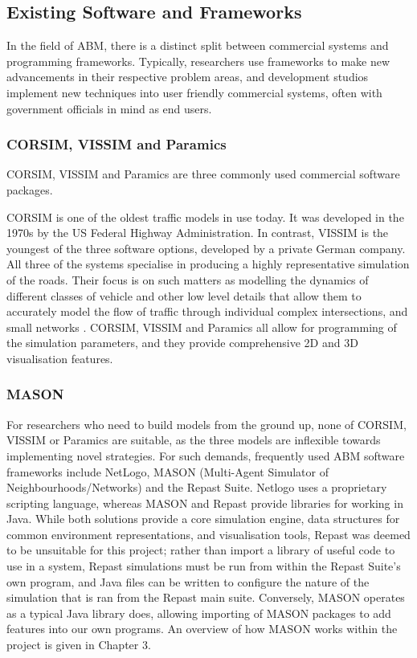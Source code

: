\subsection{Existing Software and Frameworks}

In the field of ABM, there is a distinct split between commercial systems and programming frameworks. Typically, researchers use frameworks to make new advancements in their respective problem areas, and development studios implement new techniques into user friendly commercial systems, often with government officials in mind as end users.

\subsubsection{CORSIM, VISSIM and Paramics}

CORSIM, VISSIM and Paramics are three commonly used commercial software packages.

CORSIM is one of the oldest traffic models in use today. It was developed in the 1970s by the US Federal Highway Administration. In contrast, VISSIM is the youngest of the three software options, developed by a private German company. All three of the systems specialise in producing a highly representative simulation of the roads. Their focus is on such matters as modelling the dynamics of different classes of vehicle and other low level details that allow them to accurately model the flow of traffic through individual complex intersections, and small networks \cite{Choa2004CORSIMYou}.
CORSIM, VISSIM and Paramics all allow for programming of the simulation parameters, and they provide comprehensive 2D and 3D visualisation features.


\subsubsection{MASON}

For researchers who need to build models from the ground up, none of CORSIM, VISSIM or Paramics are suitable, as the three models are inflexible towards implementing novel strategies. For such demands, frequently used ABM software frameworks include NetLogo, MASON (Multi-Agent Simulator of Neighbourhoods/Networks) and the Repast Suite. Netlogo uses a proprietary scripting language, whereas MASON and Repast provide libraries for working in Java. While  both solutions provide a core simulation engine, data structures for common environment representations, and visualisation tools, Repast was deemed to be unsuitable for this project; rather than import a library of useful code to use in a system, Repast simulations must be run from within the Repast Suite's own program, and Java files can be written to configure the nature of the simulation that is ran from the Repast main suite. Conversely, MASON operates as a typical Java library does, allowing importing of MASON packages to add features into our own programs. An overview of how MASON works within the project is given in Chapter 3.


